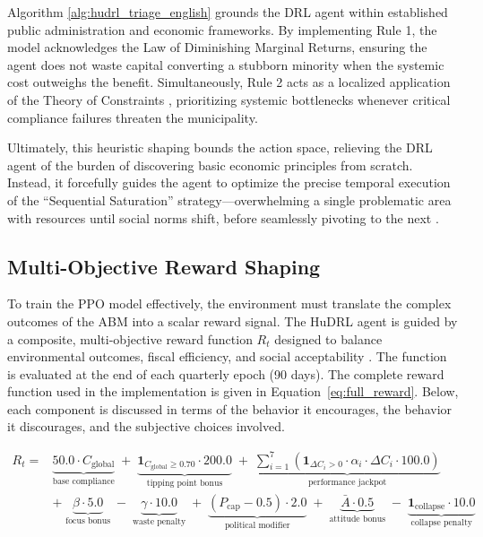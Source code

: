 Algorithm \ref{alg:hudrl_triage_english} grounds the DRL agent within established public administration and economic frameworks. By implementing Rule 1, the model acknowledges the Law of Diminishing Marginal Returns, ensuring the agent does not waste capital converting a stubborn minority when the systemic cost outweighs the benefit. Simultaneously, Rule 2 acts as a localized application of the Theory of Constraints \citep{Goldratt1984}, prioritizing systemic bottlenecks whenever critical compliance failures threaten the municipality. 

Ultimately, this heuristic shaping bounds the action space, relieving the DRL agent of the burden of discovering basic economic principles from scratch. Instead, it forcefully guides the agent to optimize the precise temporal execution of the ``Sequential Saturation'' strategy---overwhelming a single problematic area with resources until social norms shift, before seamlessly pivoting to the next \citep{Cheng2021}.

\subsection{Multi-Objective Reward Shaping}
\label{subsec:reward_shaping}

To train the PPO model effectively, the environment must translate the complex outcomes of the ABM into a scalar reward signal. The HuDRL agent is guided by a composite, multi‑objective reward function \(R_t\) designed to balance environmental outcomes, fiscal efficiency, and social acceptability \citep{Hertweck2023Values}. The function is evaluated at the end of each quarterly epoch (90 days). The complete reward function used in the implementation is given in Equation~\ref{eq:full_reward}. Below, each component is discussed in terms of the behavior it encourages, the behavior it discourages, and the subjective choices involved.

\begin{equation}
\label{eq:full_reward}
\begin{aligned}
R_t = &\underbrace{50.0 \cdot C_{\text{global}}}_{\text{base compliance}}
\;+\; \underbrace{\mathbf{1}_{C_{\text{global}} \ge 0.70} \cdot 200.0}_{\text{tipping point bonus}}
\;+\; \underbrace{\sum_{i=1}^{7} \left( \mathbf{1}_{\Delta C_i > 0} \cdot \alpha_i \cdot \Delta C_i \cdot 100.0 \right)}_{\text{performance jackpot}} \\
&+\; \underbrace{\beta \cdot 5.0}_{\text{focus bonus}}
\;-\; \underbrace{\gamma \cdot 10.0}_{\text{waste penalty}}
\;+\; \underbrace{(P_{\text{cap}} - 0.5) \cdot 2.0}_{\text{political modifier}}
\;+\; \underbrace{\bar{A} \cdot 0.5}_{\text{attitude bonus}}
\;-\; \underbrace{\mathbf{1}_{\text{collapse}} \cdot 10.0}_{\text{collapse penalty}}
\end{aligned}
\end{equation}

